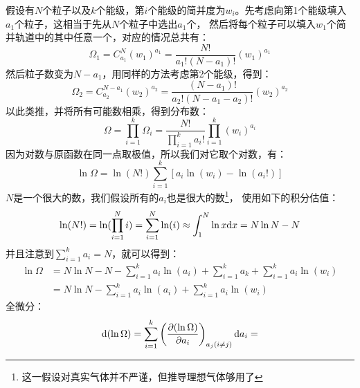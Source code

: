 \begin{prove}
            假设有$N$个粒子以及$k$个能级，第$i$个能级的简并度为$w_i$。先考虑向第1个能级填入$a_1$个粒子，这相当于先从$N$个粒子中选出$a_1$个，
            然后将每个粒子可以填入$w_1$个简并轨道中的其中任意一个，对应的情况总共有：
            \begin{equation}
                \Omega_1 =C_{a_1}^{N} (w_1)^{a_1} = \frac{N!}{a_{1}!(N-a_{1})!} (w_1)^{a_1}
            \end{equation}
            然后粒子数变为$N-a_1$，用同样的方法考虑第2个能级，得到：
            \begin{equation}
                \Omega_2 =C_{a_2}^{N-a_1} (w_2)^{a_2} = \frac{(N-a_1)!}{a_{2}!(N-a_{1}-a_{2})!} (w_2)^{a_2}
            \end{equation}
            以此类推，并将所有可能数相乘，得到分布数：
            \begin{equation}
                \Omega = \prod_{i=1}^{k} \Omega_{i} = \frac{N!}{\prod_{i = 1}^{k}a_{i}!}\prod_{i = 1}^{k} (w_i)^{a_i}
            \end{equation}
            因为对数与原函数在同一点取极值，所以我们对它取个对数，有：
            \begin{equation}
                \ln\Omega = \ln(N!)\sum_{i = 1}^{k}[{a_i}\ln(w_i) - \ln(a_i!)]
            \end{equation}
            $N$是一个很大的数，我们假设所有的$a_i$也是很大的数\footnote{这一假设对真实气体并不严谨，但推导理想气体够用了}，
            使用如下的积分估值：
            \begin{equation}
                \ln(N!) = \ln(\prod_{i=1}^{N}i)=\sum_{i=1}^{N}\ln(i) \approx \int_{1}^{N}\ln x\mathrm{d}{x} = N\ln N-N
            \end{equation}
            并且注意到$\sum_{i=1}^{k}a_i=N$，就可以得到：
            \begin{equation}
                \begin{aligned}
                    \ln\Omega &= N\ln N-N-\sum_{i=1}^{k}a_{i}\ln(a_i)+\sum_{i=1}^{k}a_k+\sum_{i = 1}^{k}{a_i}\ln(w_i)\\
                    &=N\ln N-\sum_{i=1}^{k}a_{i}\ln(a_i)+\sum_{i = 1}^{k}{a_i}\ln(w_i)
                    \label{of_omega}
                \end{aligned}
            \end{equation}
            全微分：
            \begin{equation}
                \dif{(\ln\Omega)} = \sum_{i=1}^{k}\left(\frac{\partial (\ln\Omega)}{\partial a_i}\right)_{a_j(i\neq j)} \dif{a_i} = 

\end{equation}
\end{prove}
